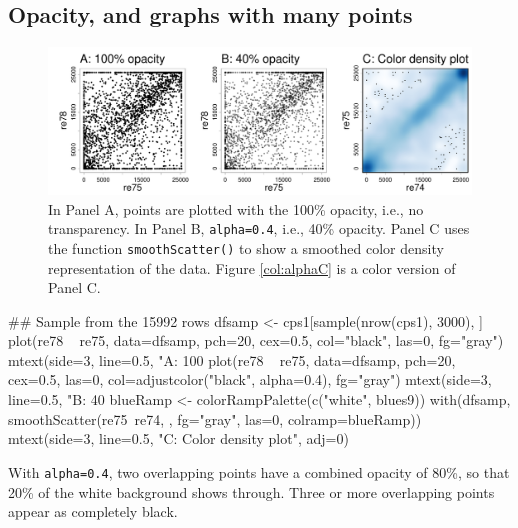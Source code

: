 \documentclass{tufte-book}\usepackage[]{graphicx}\usepackage[]{color}
\newcommand{\txtt}[1]{\texttt{#1}}
\begin{document}
\subsection*{Opacity, and graphs with many points}\label{ss:xpoint}

\begin{figure}
\begin{Schunk}


\centerline{\includegraphics[width=\textwidth]{figs/09-alpha-ex-1} }

\end{Schunk}
\caption{In Panel A, points are plotted with the 100\% opacity, i.e.,
  no transparency. In Panel B, \txtt{alpha=0.4}, i.e., 40\% opacity.
  Panel C uses the function \txtt{smoothScatter()} to show a smoothed
  color density representation of the data.  Figure \ref{col:alphaC}
  is a color version of Panel C.\label{fig:alpha}}
\end{figure}

\noindent
\begin{Schunk}
\begin{Sinput}
## Sample from the 15992 rows
dfsamp <- cps1[sample(nrow(cps1), 3000), ]
plot(re78 ~ re75, data=dfsamp, pch=20, cex=0.5,
     col="black", las=0, fg="gray")
mtext(side=3, line=0.5, "A: 100%
plot(re78 ~ re75, data=dfsamp, pch=20, cex=0.5, las=0,
     col=adjustcolor("black", alpha=0.4), fg="gray")
mtext(side=3, line=0.5, "B: 40%
blueRamp <- colorRampPalette(c("white", blues9))
with(dfsamp, smoothScatter(re75~re74, , fg="gray",
                           las=0, colramp=blueRamp))
mtext(side=3, line=0.5, "C: Color density plot",
      adj=0)
\end{Sinput}
\end{Schunk}
With \txtt{alpha=0.4}, two overlapping points have a combined
opacity of 80\%, so that 20\% of the white background shows through.
Three or more overlapping points appear as completely black.
\end{document}
